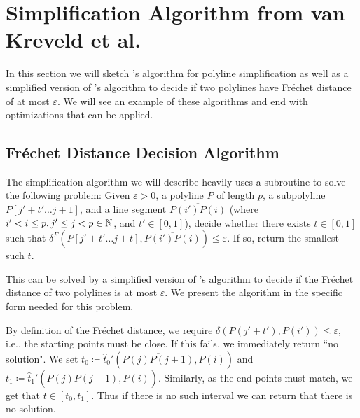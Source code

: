 \section{Simplification Algorithm from van Kreveld et al.}
\label{sec:algorithm_implementation}

In this section we will sketch \citeauthor{on_optimal_polyline_simplification_using_the_hausdorff_and_frechet_distance}'s algorithm for polyline simplification as well as a simplified version of \citeauthor{computing_the_frechet_distance_between_two_polygonal_curves}'s algorithm to decide if two polylines have Fréchet distance of at most \(\varepsilon\). We will see an example of these algorithms and end with optimizations that can be applied.

\subsection{Fréchet Distance Decision Algorithm}
\label{ssec:alt_godau}
The simplification algorithm we will describe heavily uses a subroutine to solve the following problem: Given \(\varepsilon > 0\), a polyline \(P\) of length \(p\), a subpolyline \(P[j' + t' \dots j+1]\), and a line segment \(\overline{P(i')P(i)}\) (where \(i' < i \leq p, j' \leq j < p\in \mathbb{N}\), and \(t' \in [0, 1]\)), decide whether there exists \(t \in [0, 1]\) such that \(\delta^F(P[j' + t' \dots j + t], \overline{P(i')P(i)}) \leq \varepsilon\). If so, return the smallest such \(t\).  

This can be solved by a simplified version of \citeauthor{computing_the_frechet_distance_between_two_polygonal_curves}'s algorithm to decide if the Fréchet distance of two polylines is at most \(\varepsilon\). We present the algorithm in the specific form needed for this problem. 

By definition of the Fréchet distance, we require \(\delta(P(j' + t'), P(i')) \leq \varepsilon\), i.e., the starting points must be close. If this fails, we immediately return ``no solution". We set \(t_0 \coloneq \hat t_0'(\overline{P(j)P(j+1)}, P(i))\) and \(t_1 \coloneq \hat t_1'(\overline{P(j)P(j+1)}, P(i))\). Similarly, as the end points must match, we get that \(t \in [t_0, t_1]\). Thus if there is no such interval we can return that there is no solution.

